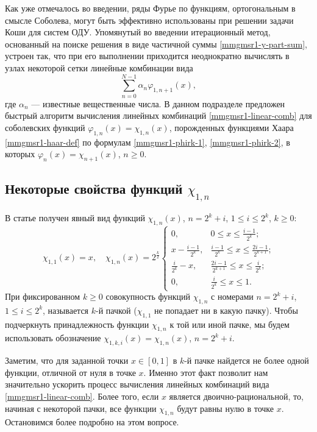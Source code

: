 Как уже отмечалось во введении, ряды Фурье по функциям, ортогональным в смысле Соболева, могут быть эффективно использованы при решении задачи Коши для систем ОДУ. 
Упомянутый во введении итерационный метод, основанный на поиске решения в виде частичной суммы \eqref{mmgmsr1-y-part-sum}, устроен так, что при его выполнении приходится неоднократно вычислять в узлах некоторой сетки линейные комбинации вида
\begin{equation}\label{mmgmsr1-linear-comb}
\sum\limits_{n=0}^{N-1}\alpha_n\varphi_{1,n+1}(x),
\end{equation}
где $\alpha_n$ --- известные вещественные числа. В данном подразделе предложен быстрый алгоритм вычисления линейных комбинаций \eqref{mmgmsr1-linear-comb} для соболевских функций $\varphi_{1,n}(x)=\chi_{1,n}(x)$, порожденных функциями Хаара \eqref{mmgmsr1-haar-def} по формулам \eqref{mmgmsr1-phirk-1}, \eqref{mmgmsr1-phirk-2}, в которых $\varphi_n(x) = \chi_{n+1}(x)$, $n \ge 0$.

\subsection{Некоторые свойства функций $\chi_{1,n}$}

В статье \cite{mmgmsr1-SharapudinovMuratova} получен явный вид функций $\chi_{1,n}(x)$, $n=2^k+i$, $1 \le i \le 2^k$, $k \ge 0$:
\begin{equation}\label{mmgmsr1-chi-1k}
\chi_{1,1}(x)=x, \quad
\chi_{1,n}(x)=2^{\frac{k}{2}}
\begin{cases} 0,&\text{$0\le x\le\frac{i-1}{2^k}$;}\\
x-\frac{i-1}{2^k},&\text{$\frac{i-1}{2^k}\le x\le \frac{2i-1}{2^{k+1}}$;}\\
\frac{i}{2^{k}}-x,&\text{$\frac{2i-1}{2^{k+1}}\le x\le \frac{i}{2^{k}}$;}\\
0, &\text{$\frac{i}{2^{k}}\le x\le1$}.
\end{cases}
\end{equation}
При фиксированном $k \ge 0$ совокупность функций $\chi_{1,n}$ с номерами $n=2^k+i$, $1 \le i \le 2^k$, называется $k$-й пачкой ($\chi_{1,1}$ не попадает ни в какую пачку). Чтобы подчеркнуть принадлежность функции $\chi_{1,n}$ к той или иной пачке, мы будем использовать обозначение $\chi_{1,k,i}(x)=\chi_{1,n}(x)$, $n=2^k+i$.

Заметим, что для заданной точки $x \in [0,1]$ в $k$-й пачке найдется не более одной функции, отличной от нуля в точке $x$. Именно этот факт позволит нам значительно ускорить процесс вычисления линейных комбинаций вида \eqref{mmgmsr1-linear-comb}. Более того, если $x$ является двоично-рациональной, то, начиная с некоторой пачки, все функции $\chi_{1,n}$ будут равны нулю в точке $x$. Остановимся более подробно на этом вопросе.

